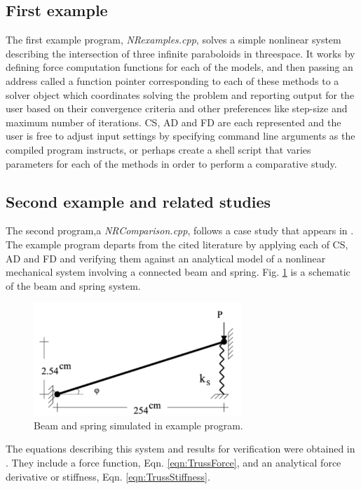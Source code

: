\documentclass[preprint,12pt]{elsarticle}
\begin{document}
\subsection{First example}
\label{subsec:ProgOne}
The first example program, \emph{NRexamples.cpp}, solves a simple nonlinear
system describing the intersection of three infinite paraboloids in threespace.
It works by defining force computation functions for each of the models, and
then passing an address called a function pointer corresponding to each of
these methods to a solver object which coordinates solving the problem and
reporting output for the user based on their convergence criteria and other
preferences like step-size and maximum number of iterations. CS, AD and FD are
each represented and the user is free to adjust input settings by specifying
command line arguments as the compiled program instructs, or perhaps create a
shell script that varies parameters for each of the methods in order to perform
a comparative study.

\subsection{Second example and related studies} 
\label{subsec:Validation}
The second program,a \emph{NRComparison.cpp}, follows a case study that appears in
\cite{rezaiee2010dynamic}. The example program departs from the cited
literature by applying each of CS, AD and FD and verifying them against an
analytical model of a nonlinear mechanical system involving a connected beam
and spring. Fig. \ref{fig:TrussSchematic} is a schematic of the beam and spring
system. 

\begin{figure}[tbp] \centering \includegraphics[width=0.7\textwidth]{./figs/truss.png}
\caption{Beam and spring simulated in example program.} \label{fig:TrussSchematic}
\end{figure}

The equations describing this system and results for verification were obtained
in \cite{rezaiee2010dynamic}. They include a force function, Eqn.
\ref{eqn:TrussForce}, and an analytical force derivative or stiffness, Eqn.
\ref{eqn:TrussStiffness}.
\end{document}
